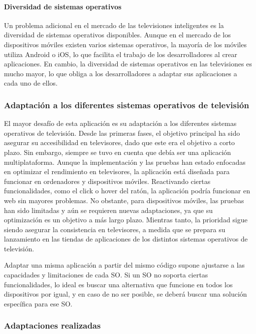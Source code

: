 \paragraph{Diversidad de sistemas operativos}
Un problema adicional en el mercado de las televisiones inteligentes es la diversidad de sistemas operativos disponibles. Aunque en 
el mercado de los dispositivos móviles existen varios sistemas operativos, la mayoría de los móviles utiliza Android o iOS, lo que 
facilita el trabajo de los desarrolladores al crear aplicaciones. En cambio, la diversidad de sistemas operativos en las televisiones 
es mucho mayor, lo que obliga a los desarrolladores a adaptar sus aplicaciones a cada uno de ellos.

\subsubsection{Adaptación a los diferentes sistemas operativos de televisión}
\label{sec:adaptacion}

El mayor desafío de esta aplicación es su adaptación a los diferentes sistemas operativos de televisión. Desde las 
primeras fases, el objetivo principal ha sido asegurar su accesibilidad en televisores, dado que este era el 
objetivo a corto plazo. Sin embargo, siempre se tuvo en cuenta que debía ser una aplicación multiplataforma. 
Aunque la implementación y las pruebas han estado enfocadas en optimizar el rendimiento en televisores, la 
aplicación está diseñada para funcionar en ordenadores y dispositivos móviles. Reactivando ciertas funcionalidades, 
como el click o hover del ratón, la aplicación podría funcionar en web sin mayores problemas. No obstante, para 
dispositivos móviles, las pruebas han sido limitadas y aún se requieren nuevas adaptaciones, ya que su optimización 
es un objetivo a más largo plazo. Mientras tanto, la prioridad sigue siendo asegurar la consistencia en televisores, 
a medida que se prepara su lanzamiento en las tiendas de aplicaciones de los distintos sistemas operativos de televisión.

Adaptar una misma aplicación a partir del mismo código supone ajustarse a las capacidades y limitaciones de cada 
SO. Si un SO no soporta ciertas funcionalidades, lo ideal es buscar una alternativa que funcione en todos 
los dispositivos por igual, y en caso de no ser posible, se deberá buscar una solución específica para ese SO.

\subsubsection{Adaptaciones realizadas}
\label{sec:adaptaciones}

